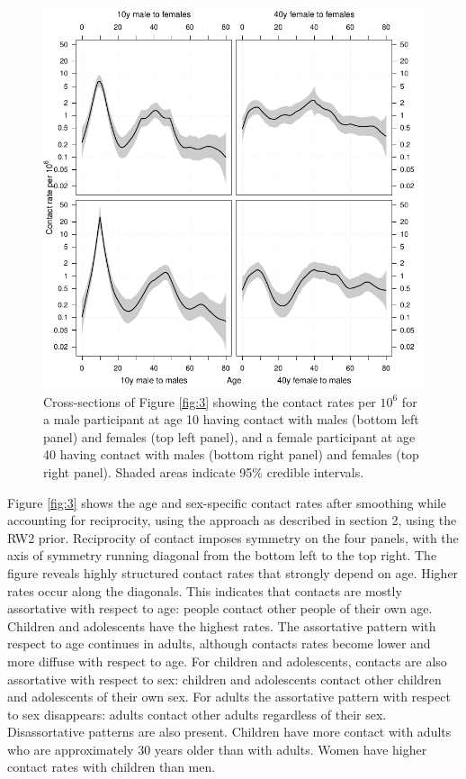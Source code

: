 \documentclass[aoas,preprint]{imsart}
\numberwithin{equation}{section}
\begin{document}
\begin{figure}
\centering
\includegraphics{fig_cross_section.pdf}
\caption{Cross-sections of Figure \ref{fig:3} showing the contact rates per $10^6$ for a male participant at age 10 having contact with males (bottom left panel) and females (top left panel), and a female participant at age 40 having contact with males (bottom right panel) and females (top right panel). Shaded areas indicate 95\% credible intervals.}
\label{fig:4}
\end{figure}

Figure \ref{fig:3} shows the age and sex-specific contact rates after smoothing while accounting for reciprocity, using the approach as described in section 2, using the RW2 prior. Reciprocity of contact imposes symmetry on the four panels, with the axis of symmetry running diagonal from the bottom left to the top right. The figure reveals highly structured contact rates that strongly depend on age. Higher rates occur along the diagonals. This indicates that contacts are mostly assortative with respect to age: people contact other people of their own age. Children and adolescents have the highest rates. The assortative pattern with respect to age continues in adults, although contacts rates become lower and more diffuse with respect to age. For children and adolescents, contacts are also assortative with respect to sex: children and adolescents contact other children and adolescents of their own sex. For adults the assortative pattern with respect to sex disappears: adults contact other adults regardless of their sex. Disassortative patterns are also present. Children have more contact with adults who are approximately 30 years older than with adults. Women have higher contact rates with children than men.
\end{document}
